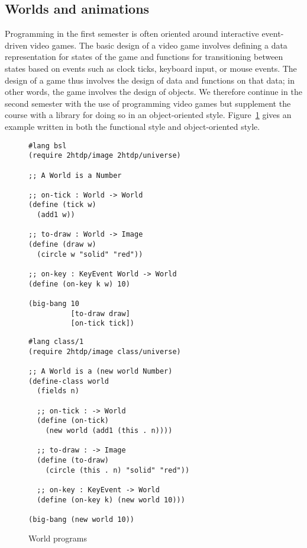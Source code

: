 \documentclass[submission,copyright]{eptcs}
\begin{document}



\subsection{Worlds and animations}

Programming in the first semester is often oriented around interactive
event-driven video games.  The basic design of a video game involves
defining a data representation for states of the game and functions
for transitioning between states based on events such as clock ticks,
keyboard input, or mouse events.  The design of a game thus involves
the design of data and functions on that data; in other words, the
game involves the design of objects.  We therefore continue in the
second semester with the use of programming video games but supplement
the course with a library for doing so in an object-oriented style.
Figure~\ref{fig:world} gives an example written in both the functional
style and object-oriented style.

\begin{figure}
\begin{minipage}[t]{3.4in}
\begin{verbatim}
#lang bsl
(require 2htdp/image 2htdp/universe)

;; A World is a Number

;; on-tick : World -> World
(define (tick w)
  (add1 w))

;; to-draw : World -> Image
(define (draw w)
  (circle w "solid" "red"))

;; on-key : KeyEvent World -> World
(define (on-key k w) 10)

(big-bang 10
          [to-draw draw]
          [on-tick tick])
\end{verbatim}
\end{minipage}
\begin{minipage}[t]{3in}
\begin{verbatim}
#lang class/1
(require 2htdp/image class/universe)

;; A World is a (new world Number)
(define-class world
  (fields n)

  ;; on-tick : -> World
  (define (on-tick)
    (new world (add1 (this . n))))

  ;; to-draw : -> Image
  (define (to-draw) 
    (circle (this . n) "solid" "red"))

  ;; on-key : KeyEvent -> World
  (define (on-key k) (new world 10)))
  
(big-bang (new world 10))
\end{verbatim}
\end{minipage}
\caption{World programs}
\label{fig:world}
\end{figure}
\end{document}
